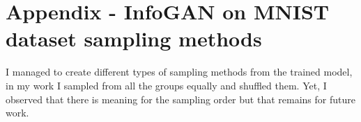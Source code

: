 \documentclass[letterpaper,12pt]{article}
\begin{document}
\section{Appendix - InfoGAN on MNIST dataset sampling methods}
I managed to create different types of sampling methods from the trained model, in my work I sampled from all the groups equally and shuffled them. Yet, I observed that there is meaning for the sampling order  but that remains for future work.\newline
\begin{figure}[H]  
    \hspace{10px}\hspace{10px}\hspace{10px}

\end{figure}
\end{document}
